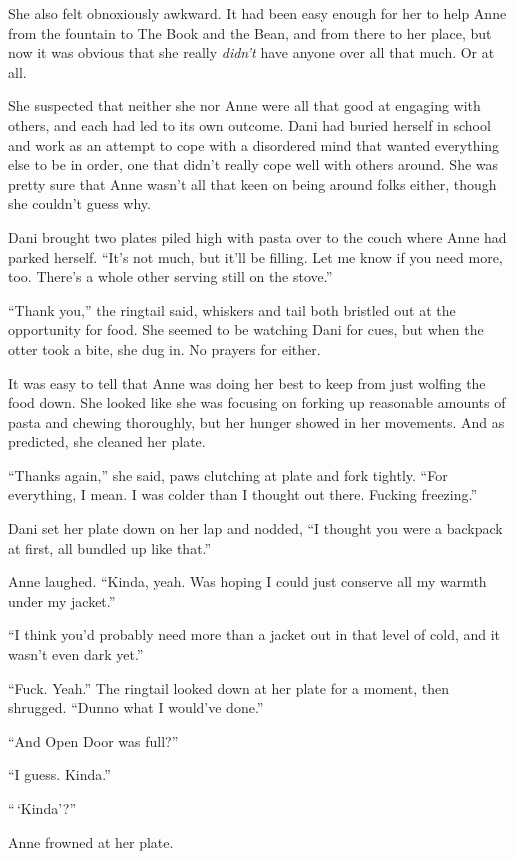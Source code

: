 She also felt obnoxiously awkward. It had been easy enough for her to help Anne from the fountain to The Book and the Bean, and from there to her place, but now it was obvious that she really \emph{didn't} have anyone over all that much. Or at all.

She suspected that neither she nor Anne were all that good at engaging with others, and each had led to its own outcome. Dani had buried herself in school and work as an attempt to cope with a disordered mind that wanted everything else to be in order, one that didn't really cope well with others around. She was pretty sure that Anne wasn't all that keen on being around folks either, though she couldn't guess why.

Dani brought two plates piled high with pasta over to the couch where Anne had parked herself. ``It's not much, but it'll be filling. Let me know if you need more, too. There's a whole other serving still on the stove.''

``Thank you,'' the ringtail said, whiskers and tail both bristled out at the opportunity for food. She seemed to be watching Dani for cues, but when the otter took a bite, she dug in. No prayers for either.

It was easy to tell that Anne was doing her best to keep from just wolfing the food down. She looked like she was focusing on forking up reasonable amounts of pasta and chewing thoroughly, but her hunger showed in her movements. And as predicted, she cleaned her plate.

``Thanks again,'' she said, paws clutching at plate and fork tightly. ``For everything, I mean. I was colder than I thought out there. Fucking freezing.''

Dani set her plate down on her lap and nodded, ``I thought you were a backpack at first, all bundled up like that.''

Anne laughed. ``Kinda, yeah. Was hoping I could just conserve all my warmth under my jacket.''

``I think you'd probably need more than a jacket out in that level of cold, and it wasn't even dark yet.''

``Fuck. Yeah.'' The ringtail looked down at her plate for a moment, then shrugged. ``Dunno what I would've done.''

``And Open Door was full?''

``I guess. Kinda.''

``\,`Kinda'?''

Anne frowned at her plate.

